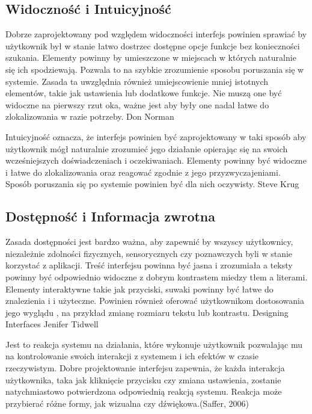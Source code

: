 \subsection{Widoczność i Intuicyjność}

Dobrze zaprojektowany pod względem widoczności interfejs powinien sprawiać by użytkownik był w stanie łatwo dostrzec dostępne opcje funkcje bez konieczności szukania. Elementy powinny by umieszczone w miejscach w których naturalnie się ich spodziewają. Pozwala to na szybkie zrozumienie sposobu poruszania się w systemie. Zasada ta uwzględnia również umiejscowienie mniej istotnych elementów, takie jak ustawienia lub dodatkowe funkcje. Nie muszą one być widoczne na pierwszy rzut oka, ważne jest aby były one nadal łatwe do zlokalizowania w razie potrzeby. Don Norman

Intuicyjność oznacza, że interfejs powinien być zaprojektowany w taki sposób aby użytkownik mógł naturalnie zrozumieć jego działanie opierając się na swoich wcześniejszych doświadczeniach i oczekiwaniach. Elementy powinny być widoczne i łatwe do zlokalizowania oraz reagować zgodnie z jego przyzwyczajeniami. Sposób poruszania się po systemie powinien być dla nich oczywisty. Steve Krug

\subsection{Dostępność i Informacja zwrotna}
Zasada dostępności jest bardzo ważna, aby zapewnić by wszyscy użytkownicy, niezależnie zdolności fizycznych, sensorycznych czy poznawczych  byli w stanie korzystać z aplikacji. Treść interfejsu powinna być jasna i zrozumiała a teksty powinny być odpowiednio widoczne  z dobrym kontrastem miedzy tłem a literami. Elementy interaktywne takie jak przyciski, suwaki powinny być łatwe do znalezienia i i użyteczne. Powinien również  oferować użytkownikom dostosowania jego wyglądu , na przykład zmianę rozmiaru tekstu lub kontrastu. Designing Interfaces Jenifer Tidwell

Jest to reakcja systemu na działania, które wykonuje użytkownik pozwalając mu na kontrolowanie swoich interakcji z systemem i ich efektów w czasie rzeczywistym. Dobre projektowanie interfejsu zapewnia, że każda interakcja użytkownika, taka jak kliknięcie przycisku czy zmiana ustawienia, zostanie natychmiastowo potwierdzona odpowiednią reakcją systemu. Reakcja może przybierać różne formy, jak wizualna czy dźwiękowa.(Saffer, 2006)


